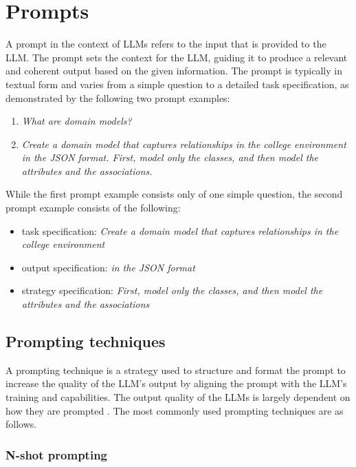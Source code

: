 \section{Prompts}

A prompt in the context of LLMs refers to the input that is provided to the LLM. The prompt sets the context for the LLM, guiding it to produce a relevant and coherent output based on the given information. The prompt is typically in textual form and varies from a simple question to a detailed task specification, as demonstrated by the following two prompt examples:

\begin{enumerate}
\item \textit{What are domain models?}
\item \textit{Create a domain model that captures relationships in the college environment in the JSON format. First, model only the classes, and then model the attributes and the associations.} \\
\end{enumerate}

\noindent{}While the first prompt example consists only of one simple question, the second prompt example consists of the following:
\begin{itemize}
\item task specification: \textit{Create a domain model that captures relationships in the college environment}
\item output specification: \textit{in the JSON format}
\item strategy specification: \textit{First, model only the classes, and then model the attributes and the associations}
\end{itemize}


\subsection{Prompting techniques}

A prompting technique is a strategy used to structure and format the prompt to increase the quality of the LLM's output by aligning the prompt with the LLM's training and capabilities. The output quality of the LLMs is largely dependent on how they are prompted \cite{Brown2020,Wei2022}. The most commonly used prompting techniques are as follows.


\subsubsection{N-shot prompting}

